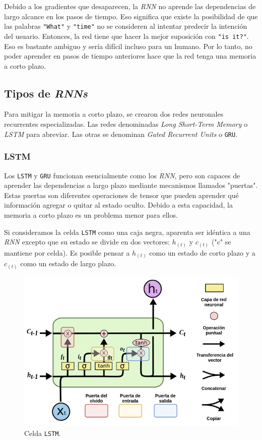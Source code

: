 \documentclass[a4paper,12pt]{article}
\begin{document}
Debido a los gradientes que desaparecen, la \textit{RNN} no aprende las dependencias de largo alcance en los pasos de tiempo. Eso significa que existe la posibilidad de que las palabras \texttt{"What"} y \texttt{"time"} no se consideren al intentar predecir la intención del usuario. Entonces, la red tiene que hacer la mejor suposición con \texttt{"is it?"}. Eso es bastante ambiguo y sería difícil incluso para un humano. Por lo tanto, no poder aprender en pasos de tiempo anteriores hace que la red tenga una memoria a corto plazo.

\subsection{Tipos de \textit{RNNs}}
Para mitigar la memoria a corto plazo, se crearon dos redes neuronales recurrentes especializadas. Las redes denominadas \textit{Long Short-Term Memory} o \textit{LSTM} para abreviar. Las otras se denominan \textit{Gated Recurrent Units} o \texttt{GRU}.

\subsubsection{LSTM}
Los \texttt{LSTM} y \texttt{GRU} funcionan esencialmente como los \textit{RNN}, pero son capaces de aprender las dependencias a largo plazo mediante mecanismos llamados "puertas". Estas puertas son diferentes operaciones de tensor que pueden aprender qué información agregar o quitar al estado oculto. Debido a esta capacidad, la memoria a corto plazo es un problema menor para ellos. \citep{olahlstm}

Si consideramos la celda \texttt{LSTM} como una caja negra, aparenta ser idéntica a una \textit{RNN} excepto que su estado se divide en dos vectores: $h_{(t)}$ y $c_{(t)}$ ("c" se mantiene por celda). Es posible pensar a $h_{(t)}$ como un estado de corto plazo y a $c_{(t)}$ como un estado de largo plazo.

\begin{figure}[H]
	\begin{center}				
		\includegraphics[width=1\textwidth]{lstmcell5.png}
		\caption{Celda \texttt{LSTM}.}
		\label{fig:lstmcell}
	\end{center}
\end{figure}
\end{document}
